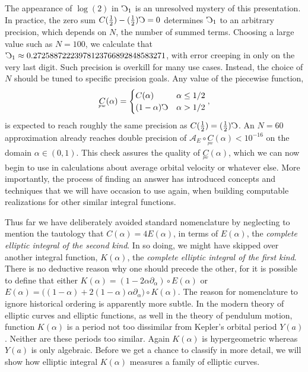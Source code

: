 \documentclass[nofootinbib,preprint]{revtex4-1}
\newcommand{\rev}[1]{\text{\reflectbox{$#1$}}}
\begin{document}
The appearance of $\log(2)$ in $\rev{C}_1$ is an unresolved mystery
of this presentation. In practice, the zero sum 
${C(\tfrac{1}{2})-(\tfrac{1}{2})\rev{C}=0}$ determines $\rev{C}_1$ 
to an arbitrary precision, which depends on $N$, the number of summed terms. 
Choosing a large value such as $N=100$, we calculate that
${\rev{C}_1 \approx 0.27258872223978123766892848583271}$,
with error creeping in only on the very last digit. Such precision is 
overkill for many use cases. Instead, the choice of $N$ should be 
tuned to specific precision goals. Any value of the piecewise function,
\begin{eqnarray}
\underset{^{pw}}{C}(\alpha) = \begin{cases} 
C(\alpha) & \alpha \le 1/2 \\
(1-\alpha)\rev{C} & \alpha > 1/2  \end{cases}, \nonumber
\end{eqnarray}
is expected to reach roughly the same precision as $C(\frac{1}{2})=(\frac{1}{2})\rev{C}$. 
An $N=60$ approximation already reaches double precision 
of ${\mathcal{A}_E \circ \underset{^{pw}}{C}(\alpha)<10^{-16}}$ on the domain $
\alpha \in (0,1)$. This check assures the quality of $\underset{^{pw}}{C}(\alpha)$,
which we can now begin to use in calculations about average orbital velocity or
whatever else. More importantly, the process of finding an answer has introduced 
concepts and techniques that we will have occasion to use again, when building 
computable realizations for other similar integral functions. 

Thus far we have deliberately avoided standard nomenclature by neglecting 
to mention the tautology that $C(\alpha)=4E(\alpha)$, 
in terms of $E(\alpha)$, the \textit{complete elliptic integral of the second kind}. 
In so doing, we might have skipped over another integral function, $K(\alpha)$, the 
\textit{complete elliptic integral of the first kind}. There is no 
deductive reason why one should precede the other, for it is possible to define 
that either $K(\alpha)=(1-2\alpha \partial_{\alpha})\circ E(\alpha)$ or  
$E(\alpha) =\big( (1-\alpha) + 2(1-\alpha)\alpha \partial_{\alpha} \big) \circ K(\alpha)$.
The reason for nomenclature to ignore historical ordering is apparently more subtle. 
In the modern theory of elliptic curves and elliptic functions, as well in the theory 
of pendulum motion, function $K(\alpha)$ is a period not too dissimilar from Kepler's 
orbital period $Y(a)$. Neither are these periods too similar. Again $K(\alpha)$ is 
hypergeometric whereas $Y(a)$ is only algebraic. Before we get a chance to classify
in more detail, we will show how elliptic integral $K(\alpha)$ 
measures a family of elliptic curves.
\end{document}
